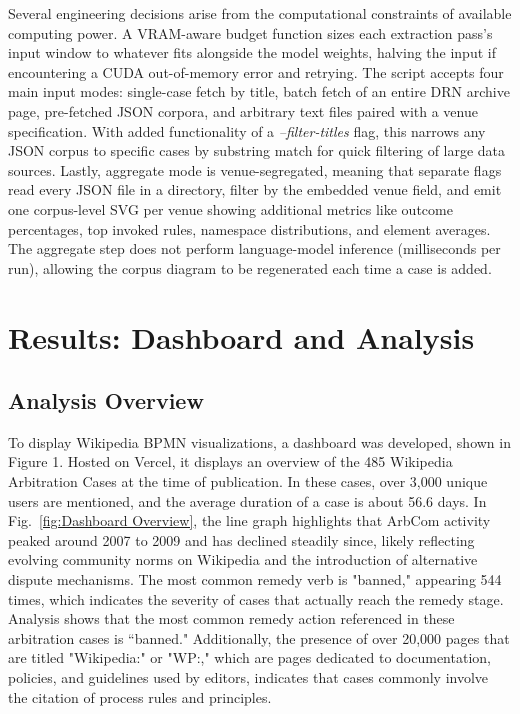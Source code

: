 \documentclass[conference]{IEEEtran}
\begin{document}
Several engineering decisions arise from the computational constraints of available computing power. A VRAM-aware budget function sizes each extraction pass's input window to whatever fits alongside the model weights, halving the input if encountering a CUDA out-of-memory error and retrying. The script accepts four main input modes: single-case fetch by title, batch fetch of an entire DRN archive page, pre-fetched JSON corpora, and arbitrary text files paired with a venue specification. With added functionality of a \textit{--filter-titles} flag, this narrows any JSON corpus to specific cases by substring match for quick filtering of large data sources. Lastly, aggregate mode is venue-segregated, meaning that separate flags read every JSON file in a directory, filter by the embedded venue field, and emit one corpus-level SVG per venue showing additional metrics like outcome percentages, top invoked rules, namespace distributions, and element averages. The aggregate step does not perform language-model inference (milliseconds per run), allowing the corpus diagram to be regenerated each time a case is added.

\section{Results: Dashboard and Analysis}
\subsection{Analysis Overview}
To display Wikipedia BPMN visualizations, a dashboard was developed, shown in Figure 1. Hosted on Vercel, it displays an overview of the 485 Wikipedia Arbitration Cases at the time of publication. In these cases, over 3,000 unique users are mentioned, and the average duration of a case is about 56.6 days. In Fig.~\ref{fig:Dashboard Overview}, the line graph highlights that ArbCom activity peaked around 2007 to 2009 and has declined steadily since, likely reflecting evolving community norms on Wikipedia and the introduction of alternative dispute mechanisms. The most common remedy verb is "banned," appearing 544 times, which indicates the severity of cases that actually reach the remedy stage. Analysis shows that the most common remedy action referenced in these arbitration cases is “banned." Additionally, the presence of over 20,000 pages that are titled "Wikipedia:" or "WP:," which are pages dedicated to documentation, policies, and guidelines used by editors, indicates that cases commonly involve the citation of process rules and principles.
\end{document}
